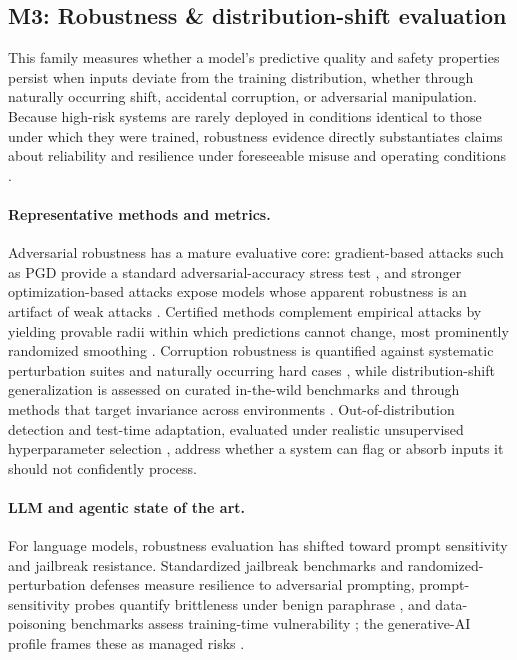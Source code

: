 \subsection{M3: Robustness \& distribution-shift evaluation}

This family measures whether a model's predictive quality and safety properties persist when inputs deviate from the training distribution, whether through naturally occurring shift, accidental corruption, or adversarial manipulation. Because high-risk systems are rarely deployed in conditions identical to those under which they were trained, robustness evidence directly substantiates claims about reliability and resilience under foreseeable misuse and operating conditions \cite{nist2023airmf,euaiact2024}.

\paragraph{Representative methods and metrics.} Adversarial robustness has a mature evaluative core: gradient-based attacks such as PGD provide a standard adversarial-accuracy stress test \cite{madry2018pgd,goodfellow2015explaining}, and stronger optimization-based attacks expose models whose apparent robustness is an artifact of weak attacks \cite{carlini2016c2}. Certified methods complement empirical attacks by yielding provable radii within which predictions cannot change, most prominently randomized smoothing \cite{cohen2019certified}. Corruption robustness is quantified against systematic perturbation suites \cite{hendrycks2019corruption} and naturally occurring hard cases \cite{hendrycks2019natural}, while distribution-shift generalization is assessed on curated in-the-wild benchmarks \cite{koh2021wilds} and through methods that target invariance across environments \cite{arjovsky2019irm}. Out-of-distribution detection \cite{liang2024ood} and test-time adaptation, evaluated under realistic unsupervised hyperparameter selection \cite{tta2024realistic}, address whether a system can flag or absorb inputs it should not confidently process.

\paragraph{LLM and agentic state of the art.} For language models, robustness evaluation has shifted toward prompt sensitivity and jailbreak resistance. Standardized jailbreak benchmarks \cite{jailbreakbench2024} and randomized-perturbation defenses \cite{smoothllm2023} measure resilience to adversarial prompting, prompt-sensitivity probes quantify brittleness under benign paraphrase \cite{brittlebench2025}, and data-poisoning benchmarks assess training-time vulnerability \cite{poisonbench2024}; the generative-AI profile frames these as managed risks \cite{nist2024genai}.

